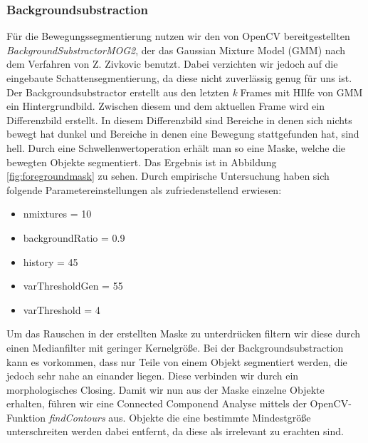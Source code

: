 \documentclass[conference]{IEEEtran}
\begin{document}
\subsubsection{Backgroundsubstraction}

Für die Bewegungssegmentierung nutzen wir den von OpenCV bereitgestellten \textit{BackgroundSubstractorMOG2}, der das Gaussian Mixture Model (GMM) nach dem Verfahren von Z. Zivkovic \cite{zivkovic} benutzt. Dabei verzichten wir jedoch auf die eingebaute Schattensegmentierung, da diese nicht zuverlässig genug für uns ist. Der Backgroundsubstractor erstellt aus den letzten \textit{k} Frames mit HIlfe von GMM ein Hintergrundbild. Zwischen diesem und dem aktuellen Frame wird ein Differenzbild erstellt. In diesem Differenzbild sind Bereiche in denen sich nichts bewegt hat dunkel und Bereiche in denen eine Bewegung stattgefunden hat, sind hell. Durch eine Schwellenwertoperation erhält man so eine Maske, welche die bewegten Objekte segmentiert. Das Ergebnis ist in Abbildung \ref{fig:foregroundmask} zu sehen.
Durch empirische Untersuchung haben sich folgende Parametereinstellungen als zufriedenstellend erwiesen:
\begin{itemize}
	\item nmixtures = 10
	\item backgroundRatio = 0.9
	\item history = 45
	\item varThresholdGen = 55
	\item varThreshold = 4
\end{itemize}
Um das Rauschen in der erstellten Maske zu unterdrücken filtern wir diese durch einen Medianfilter mit geringer Kernelgröße. Bei der Backgroundsubstraction kann es vorkommen, dass nur Teile von einem Objekt segmentiert werden, die jedoch sehr nahe an einander liegen. Diese verbinden wir durch ein morphologisches Closing.
Damit wir nun aus der Maske einzelne Objekte erhalten, führen wir eine Connected Componend Analyse mittels der OpenCV-Funktion \textit{findContours} aus. Objekte die eine bestimmte Mindestgröße unterschreiten werden dabei entfernt, da diese als irrelevant zu erachten sind.
\end{document}
